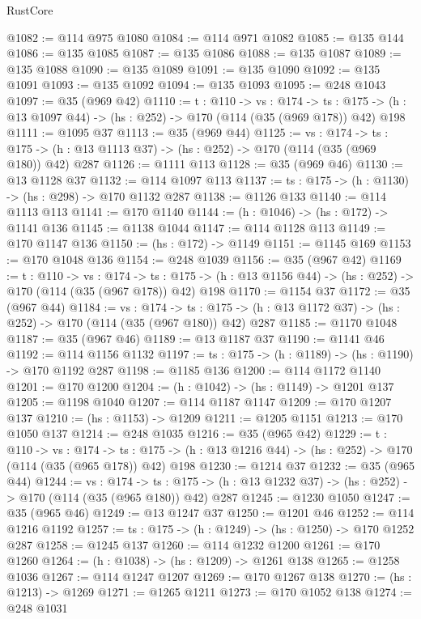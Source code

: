 \begin{lexlean}{RustCore}
\begin{coremodule}
@1082 := @114 @975 @1080
@1084 := @114 @971 @1082
@1085 := @135 @144
@1086 := @135 @1085
@1087 := @135 @1086
@1088 := @135 @1087
@1089 := @135 @1088
@1090 := @135 @1089
@1091 := @135 @1090
@1092 := @135 @1091
@1093 := @135 @1092
@1094 := @135 @1093
@1095 := @248 @1043
@1097 := @35 (@969 @42)
@1110 := {t : @110} ->
  {vs : @174} ->
  {ts : @175} -> (h : @13 @1097 @44) -> (hs : @252) -> @170 (@114 (@35 (@969 @178)) @42) @198
@1111 := @1095 @37
@1113 := @35 (@969 @44)
@1125 := {vs : @174} ->
  {ts : @175} -> (h : @13 @1113 @37) -> (hs : @252) -> @170 (@114 (@35 (@969 @180)) @42) @287
@1126 := @1111 @113
@1128 := @35 (@969 @46)
@1130 := @13 @1128 @37
@1132 := @114 @1097 @113
@1137 := {ts : @175} -> (h : @1130) -> (hs : @298) -> @170 @1132 @287
@1138 := @1126 @133
@1140 := @114 @1113 @113
@1141 := @170 @1140
@1144 := (h : @1046) -> (hs : @172) -> @1141 @136
@1145 := @1138 @1044
@1147 := @114 @1128 @113
@1149 := @170 @1147 @136
@1150 := (hs : @172) -> @1149
@1151 := @1145 @169
@1153 := @170 @1048 @136
@1154 := @248 @1039
@1156 := @35 (@967 @42)
@1169 := {t : @110} ->
  {vs : @174} ->
  {ts : @175} -> (h : @13 @1156 @44) -> (hs : @252) -> @170 (@114 (@35 (@967 @178)) @42) @198
@1170 := @1154 @37
@1172 := @35 (@967 @44)
@1184 := {vs : @174} ->
  {ts : @175} -> (h : @13 @1172 @37) -> (hs : @252) -> @170 (@114 (@35 (@967 @180)) @42) @287
@1185 := @1170 @1048
@1187 := @35 (@967 @46)
@1189 := @13 @1187 @37
@1190 := @1141 @46
@1192 := @114 @1156 @1132
@1197 := {ts : @175} -> (h : @1189) -> (hs : @1190) -> @170 @1192 @287
@1198 := @1185 @136
@1200 := @114 @1172 @1140
@1201 := @170 @1200
@1204 := (h : @1042) -> (hs : @1149) -> @1201 @137
@1205 := @1198 @1040
@1207 := @114 @1187 @1147
@1209 := @170 @1207 @137
@1210 := (hs : @1153) -> @1209
@1211 := @1205 @1151
@1213 := @170 @1050 @137
@1214 := @248 @1035
@1216 := @35 (@965 @42)
@1229 := {t : @110} ->
  {vs : @174} ->
  {ts : @175} -> (h : @13 @1216 @44) -> (hs : @252) -> @170 (@114 (@35 (@965 @178)) @42) @198
@1230 := @1214 @37
@1232 := @35 (@965 @44)
@1244 := {vs : @174} ->
  {ts : @175} -> (h : @13 @1232 @37) -> (hs : @252) -> @170 (@114 (@35 (@965 @180)) @42) @287
@1245 := @1230 @1050
@1247 := @35 (@965 @46)
@1249 := @13 @1247 @37
@1250 := @1201 @46
@1252 := @114 @1216 @1192
@1257 := {ts : @175} -> (h : @1249) -> (hs : @1250) -> @170 @1252 @287
@1258 := @1245 @137
@1260 := @114 @1232 @1200
@1261 := @170 @1260
@1264 := (h : @1038) -> (hs : @1209) -> @1261 @138
@1265 := @1258 @1036
@1267 := @114 @1247 @1207
@1269 := @170 @1267 @138
@1270 := (hs : @1213) -> @1269
@1271 := @1265 @1211
@1273 := @170 @1052 @138
@1274 := @248 @1031

\end{coremodule}
\end{lexlean}
